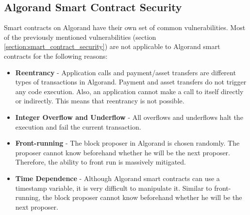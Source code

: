 \subsection*{Algorand Smart Contract Security} \label{section:algorand-smartcontracts-security}
Smart contracts on Algorand have their own set of common vulnerabilities. Most of the previously mentioned vulnerabilities (section \ref{section:smart_contract_security}) are not applicable to Algorand smart contracts for the following reasons:
\begin{itemize}
    \item \textbf{Reentrancy} - Application calls and payment/asset transfers are different types of transactions in Algorand. Payment and asset transfers do not trigger any code execution. Also, an application cannot make a call to itself directly or indirectly. This means that reentrancy is not possible.
    \item \textbf{Integer Overflow and Underflow} - All overflows and underflows halt the execution and fail the current transaction.
    \item \textbf{Front-running} - The block proposer in Algorand is chosen randomly. The proposer cannot know beforehand whether he will be the next proposer. Therefore, the ability to front run is massively mitigated.
    \item \textbf{Time Dependence} - Although Algorand smart contracts can use a timestamp variable, it is very difficult to manipulate it. Similar to front-running, the block proposer cannot know beforehand whether he will be the next proposer.
\end{itemize}


